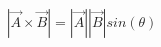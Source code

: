 \documentclass[preview]{standalone}
\begin{document}
\begin{align*}
| \vec{A} \times \vec{B} | = | \vec{A} | | \vec{B} | sin(\theta)
\end{align*}
\end{document}
